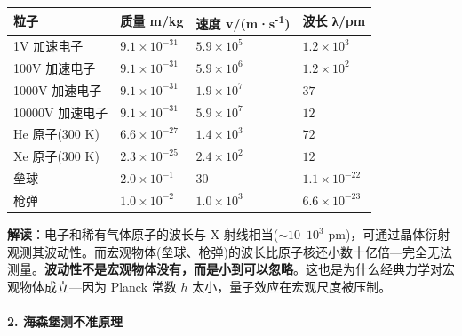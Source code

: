 {\def\LTcaptype{none} %
\begin{longtable}[]{@{}
  >{\raggedright\arraybackslash}p{}
  >{\raggedleft\arraybackslash}p{}
  >{\centering\arraybackslash}p{}
  >{\centering\arraybackslash}p{}@{}}
\toprule\noalign{}
\begin{minipage}[b]{\linewidth}\raggedright
粒子
\end{minipage} & \begin{minipage}[b]{\linewidth}\raggedleft
质量 m/kg
\end{minipage} & \begin{minipage}[b]{\linewidth}\centering
速度 v/(m·s\textsuperscript{-1})
\end{minipage} & \begin{minipage}[b]{\linewidth}\centering
波长 λ/pm
\end{minipage} \\
\midrule\noalign{}
\endhead
\bottomrule\noalign{}
\endlastfoot
1V 加速电子 & \(9.1\times 10^{-31}\) & \(5.9\times 10^5\) & \(1.2\times 10^{3}\) \\
100V 加速电子 & \(9.1\times 10^{-31}\) & \(5.9\times 10^6\) & \(1.2\times 10^{2}\) \\
1000V 加速电子 & \(9.1\times 10^{-31}\) & \(1.9\times 10^7\) & \(37\) \\
10000V 加速电子 & \(9.1\times 10^{-31}\) & \(5.9\times 10^7\) & \(12\) \\
He 原子(300 K) & \(6.6\times 10^{-27}\) & \(1.4\times 10^3\) & \(72\) \\
Xe 原子(300 K) & \(2.3\times 10^{-25}\) & \(2.4\times 10^2\) & \(12\) \\
垒球 & \(2.0\times 10^{-1}\) & \(30\) & \(1.1\times 10^{-22}\) \\
枪弹 & \(1.0\times 10^{-2}\) & \(1.0\times 10^3\) & \(6.6\times 10^{-23}\) \\
\end{longtable}
}

\textbf{解读}：电子和稀有气体原子的波长与 X 射线相当(\(\sim 10\text{–}10^3\) pm)，可通过晶体衍射观测其波动性。而宏观物体(垒球、枪弹)的波长比原子核还小数十亿倍---完全无法测量。\textbf{波动性不是宏观物体没有，而是小到可以忽略}。这也是为什么经典力学对宏观物体成立---因为 Planck 常数 \(h\) 太小，量子效应在宏观尺度被压制。

\paragraph{2. 海森堡测不准原理}\label{ux6d77ux68eeux5821ux6d4bux4e0dux51c6ux539fux7406}

